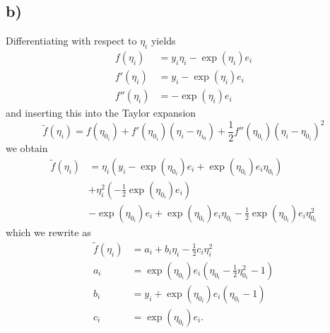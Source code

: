 \documentclass[a4paper]{article}\usepackage[]{graphicx}\usepackage[]{color}
\begin{document}
\subsection*{b)}
Differentiating with respect to $\eta_i$ yields
\begin{align}
f(\eta_i) & = y_i \eta_i - \exp(\eta_i) e_i \\
f'(\eta_i) & = y_i - \exp(\eta_i) e_i \\
f''(\eta_i) & = - \exp(\eta_i) e_i
\end{align}
and inserting this into the Taylor expansion
\begin{equation}
\tilde{f}(\eta_i) = f(\eta_{0_i}) + f'(\eta_{0_i})(\eta_i - \eta_{i_0}) + \frac{1}{2} f''(\eta_{0_i})(\eta_i - \eta_{0_i})^2
\end{equation}
we obtain
\begin{equation}
\begin{aligned}
\tilde{f}(\eta_i) & = \eta_i \left( y_i - \exp(\eta_{0_i}) e_i + \exp(\eta_{0_i}) e_i \eta_{0_i}\right) \\
 & + \eta_i^2 \left( -\frac{1}{2} \exp(\eta_{0_i}) e_i \right) \\
 & - \exp(\eta_{0_i}) e_i + \exp(\eta_{0_i}) e_i \eta_{0_i} - \frac{1}{2} \exp(\eta_{0_i}) e_i \eta_{0_i}^2
\end{aligned}
\end{equation}
which we rewrite as
\begin{equation}
\begin{aligned}
\tilde{f}(\eta_i) &= a_i + b_i \eta_i - \frac{1}{2}c_i \eta_i^2 \\
a_i &= \exp(\eta_{0_i}) e_i ( \eta_{0_i} - \frac{1}{2} \eta_{0_i}^2 - 1) \\
b_i &= y_i + \exp(\eta_{0_i}) e_i (\eta_{0_i} - 1) \\
c_i &= \exp(\eta_{0_i}) e_i.
\end{aligned}
\label{eq:taylor_expansion}
\end{equation}
\end{document}
